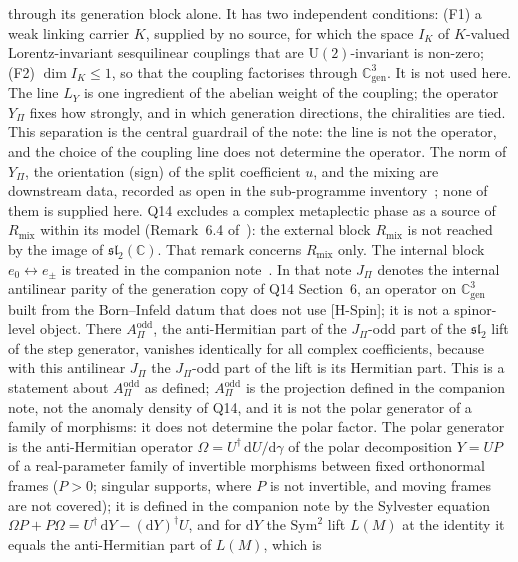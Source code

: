 \documentclass[11pt]{article}
\theoremstyle{definition}
\theoremstyle{remark}
\newcommand{\JPi}{J_{\Pi}}
\newcommand{\AOdd}{A_{\Pi}^{\mathrm{odd}}}
\newcommand{\Opol}{\Omega}
\newcommand{\Rmix}{R_{\mathrm{mix}}}
\newcommand{\Cgen}{\mathbb{C}^{3}_{\mathrm{gen}}}
\newcommand{\LY}{L_{Y}}
\newcommand{\UU}{\mathrm{U}}
\begin{document}
    through its generation block alone.
    It has two independent conditions: (F1) a weak linking carrier $K$, supplied by no source, for which the space
    $I_{K}$ of $K$-valued Lorentz-invariant sesquilinear couplings that are $\UU(2)$-invariant is non-zero; (F2)
    $\dim I_{K} \leq
    1$, so that the coupling factorises through $\Cgen$.
    It is not used here.
    The line $\LY$ is one ingredient of the abelian weight of the coupling; the operator $Y_{\Pi}$ fixes how strongly,
    and in which generation directions, the chiralities are tied.
    This separation is the central guardrail of the note: the line is not the operator, and the choice of the coupling
    line does not determine the operator.
    The norm of $Y_{\Pi}$, the orientation (sign) of the split coefficient $u$, and the mixing are downstream data,
    recorded as open in the sub-programme inventory~\cite{Beau2026fmnote}; none of them is supplied here.
    Q14 excludes a complex metaplectic phase as a source of $\Rmix$ within its model (Remark~6.4
    of~\cite{Beau2026q14}): the external block $\Rmix$ is not reached by the image of $\mathfrak{sl}_{2}(\mathbb{C})$.
    That remark concerns $\Rmix$ only.
    The internal block $e_{0} \leftrightarrow e_{\pm}$ is treated in the companion note~\cite{Beau2026pyo}.
    In that note $\JPi$ denotes the internal antilinear parity of the generation copy of Q14 Section~6, an operator on
    $\Cgen$ built from the Born--Infeld datum that does not use [H-Spin]; it is not a spinor-level object.
    There $\AOdd$, the anti-Hermitian part of the $\JPi$-odd part of the $\mathfrak{sl}_{2}$ lift of the step
    generator, vanishes identically for all complex coefficients, because with this antilinear $\JPi$ the
    $\JPi$-odd part of the lift is its Hermitian part.
    This is a statement about $\AOdd$ as defined; $\AOdd$ is the projection defined in the companion note, not the
    anomaly density of Q14, and it is not the polar generator of a family of morphisms: it does not determine the
    polar factor.
    The polar generator is the anti-Hermitian operator $\Opol = U^{\dagger}\,\mathrm{d}U/\mathrm{d}\gamma$ of the
    polar decomposition $Y = UP$ of a real-parameter family of invertible morphisms between fixed orthonormal frames
    ($P > 0$; singular supports, where $P$ is not invertible, and moving frames are not covered);
    it is defined in the companion note by the Sylvester equation
    $\Opol P + P \Opol = U^{\dagger}\,\mathrm{d}Y - (\mathrm{d}Y)^{\dagger} U$, and for $\mathrm{d}Y$ the
    $\mathrm{Sym}^{2}$ lift $L(M)$ at the identity it equals the anti-Hermitian part of $L(M)$, which is
\end{document}
